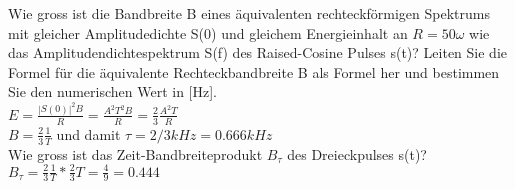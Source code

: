 Wie gross ist die Bandbreite B eines äquivalenten rechteckförmigen Spektrums mit gleicher Amplitudedichte S(0) und gleichem Energieinhalt an $R = 50 \omega$ wie das Amplitudendichtespektrum S(f) des Raised-Cosine Pulses s(t)? Leiten Sie die Formel für die äquivalente Rechteckbandbreite B als Formel her und bestimmen Sie den numerischen Wert in [Hz].\\
$E=\frac{|S(0)|^2B}{R}=\frac{A^2T^2B}{R}=\frac{2}{3}\frac{A^2T}{R}$\\
$B=\frac{2}{3}\frac{1}{T}$ und damit $\tau = 2/3 kHz = 0.666 kHz$\\

Wie gross ist das Zeit-Bandbreiteprodukt $B_{\tau}$ des Dreieckpulses s(t)?\\
$B_{\tau}=\frac{2}{3}\frac{1}{T}*\frac{2}{3}T=\frac{4}{9}=0.444$